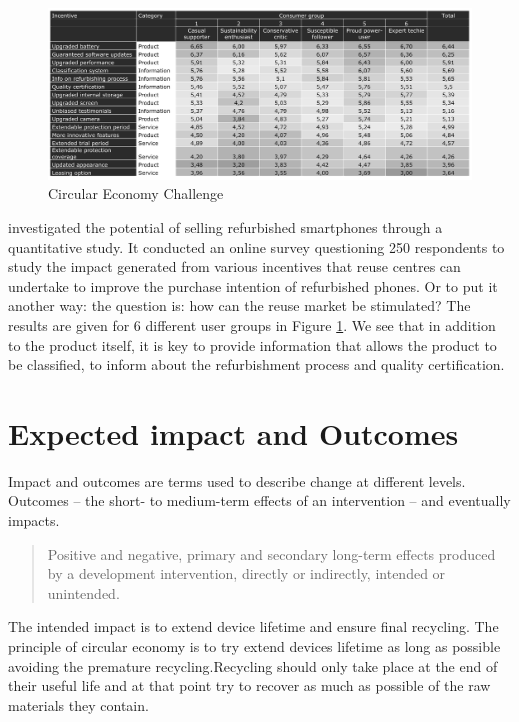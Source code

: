 \documentclass[
]{book}
\begin{document}
\begin{figure}

{\centering \includegraphics[width=1\linewidth]{./figs/1g} 

}

\caption{Circular Economy Challenge}\label{fig:figmugge}
\end{figure}

\citet{Mugge2017} investigated the potential of selling refurbished smartphones through a quantitative study. It conducted an online survey questioning 250 respondents to study the impact generated from various incentives that reuse centres can undertake to improve the purchase intention of refurbished phones. Or to put it another way: the question is: how can the reuse market be stimulated? The results are given for 6 different user groups in Figure \ref{fig:figmugge}. We see that in addition to the product itself, it is key to provide information that allows the product to be classified, to inform about the refurbishment process and quality certification.

\hypertarget{expected-impact-and-outcomes}{%
\chapter{Expected impact and Outcomes}\label{expected-impact-and-outcomes}}

Impact and outcomes are terms used to describe change at different levels. Outcomes -- the short- to medium-term effects of an intervention -- and eventually impacts.

\begin{quote}
Positive and negative, primary and secondary long-term effects produced by a development intervention, directly or indirectly, intended or unintended.
\end{quote}

The intended impact is to extend device lifetime and ensure final recycling. The principle of circular economy is to try extend devices lifetime as long as possible avoiding the premature recycling.Recycling should only take place at the end of their useful life and at that point try to recover as much as possible of the raw materials they contain.
\end{document}
